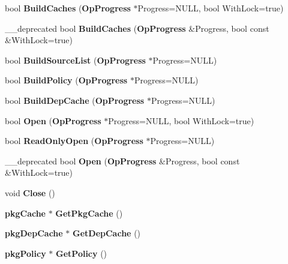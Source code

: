 \begin{DoxyCompactItemize}
\item 
bool {\bfseries \-Build\-Caches} ({\bf \-Op\-Progress} $\ast$\-Progress=\-N\-U\-L\-L, bool \-With\-Lock=true)\label{classpkgCacheFile_ae17521c1566d7f7d902352b96114e14e}

\item 
\-\_\-\-\_\-deprecated bool {\bfseries \-Build\-Caches} ({\bf \-Op\-Progress} \&\-Progress, bool const \&\-With\-Lock=true)\label{classpkgCacheFile_ab03847ba597b29423a98e1a7c40284b9}

\item 
bool {\bfseries \-Build\-Source\-List} ({\bf \-Op\-Progress} $\ast$\-Progress=\-N\-U\-L\-L)\label{classpkgCacheFile_a26f8e9107e1c40e1d12522618ed0b9a3}

\item 
bool {\bfseries \-Build\-Policy} ({\bf \-Op\-Progress} $\ast$\-Progress=\-N\-U\-L\-L)\label{classpkgCacheFile_a40ee2c13fa1449a2ee3525d28f7723ef}

\item 
bool {\bfseries \-Build\-Dep\-Cache} ({\bf \-Op\-Progress} $\ast$\-Progress=\-N\-U\-L\-L)\label{classpkgCacheFile_a8ac9974762b6a23a6ac99eb0164f97e5}

\item 
bool {\bfseries \-Open} ({\bf \-Op\-Progress} $\ast$\-Progress=\-N\-U\-L\-L, bool \-With\-Lock=true)\label{classpkgCacheFile_ad191678b9795ac52f6895031ad9181f3}

\item 
bool {\bfseries \-Read\-Only\-Open} ({\bf \-Op\-Progress} $\ast$\-Progress=\-N\-U\-L\-L)\label{classpkgCacheFile_af14baeae61d7a068e5522c22d20aedfb}

\item 
\-\_\-\-\_\-deprecated bool {\bfseries \-Open} ({\bf \-Op\-Progress} \&\-Progress, bool const \&\-With\-Lock=true)\label{classpkgCacheFile_ad7020c02cd74d694c11a426b66dacf59}

\item 
void {\bfseries \-Close} ()\label{classpkgCacheFile_a7f7a3199c392465d0767c6506c1af5b4}

\item 
{\bf pkg\-Cache} $\ast$ {\bfseries \-Get\-Pkg\-Cache} ()\label{classpkgCacheFile_aa049501b926c4401f8525309151251a2}

\item 
{\bf pkg\-Dep\-Cache} $\ast$ {\bfseries \-Get\-Dep\-Cache} ()\label{classpkgCacheFile_a1cd37af7e49c280f162ed58bfb38e9c4}

\item 
{\bf pkg\-Policy} $\ast$ {\bfseries \-Get\-Policy} ()\label{classpkgCacheFile_a0d8cd917b9ec9112475caf778beb46fc}


\end{DoxyCompactItemize}
